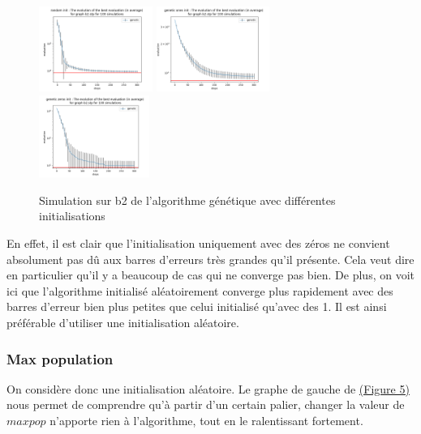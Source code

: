 \documentclass[11pt,french]{report}
\begin{document}
        \begin{figure}
          \includegraphics[width=0.33\textwidth]{best_b2_evaluation_genetic random init.png}
          \includegraphics[width=0.33\textwidth]{best_b2_evaluation_genetic ones init.png}
          \includegraphics[width=0.32\textwidth]{best_b2_evaluation_genetic zeros init.png}
          \caption{Simulation sur b2 de l'algorithme génétique avec différentes initialisations}
          \label{Figure4}
        \end{figure}
        

        En effet, il est clair que l'initialisation uniquement avec des zéros ne convient absolument pas dû aux barres d'erreurs très grandes qu'il présente. Cela veut dire en particulier qu'il y a beaucoup de cas qui ne converge pas bien. De plus, on voit ici que l'algorithme initialisé aléatoirement converge plus rapidement avec des barres d'erreur bien plus petites que celui initialisé qu'avec des 1.
        Il est ainsi préférable d'utiliser une initialisation aléatoire.

        \subsubsection{Max population}
        On considère donc une initialisation aléatoire. Le graphe de gauche de  \hyperref[Figure5]{(Figure 5)} nous permet de comprendre qu'à partir d'un certain palier, changer la valeur de $maxpop$ n'apporte rien à l'algorithme, tout en le ralentissant fortement.
\end{document}
